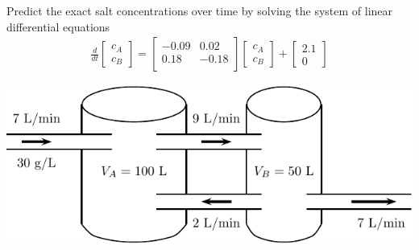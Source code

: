 \newpage

\begin{minipage}[h]{0.5\linewidth}
\vspace{0pt}
\begin{problem}
  Predict the exact salt concentrations over time by 
  solving the system of linear differential equations
  \begin{align*}
 \frac{d}{dt}    
 \begin{bmatrix} c_A \\ c_B 
     \end{bmatrix}
 =
 \begin{bmatrix}
 -0.09 & 0.02 \\
 0.18& -0.18 \\
 \end{bmatrix}
 \begin{bmatrix} c_A \\ c_B 
     \end{bmatrix}
+ 
\begin{bmatrix}
  2.1 \\ 0 
\end{bmatrix}
  \end{align*}
\end{problem}
\end{minipage} \hfill
\begin{minipage}[h]{0.45\linewidth}
\vspace{0pt}
\includegraphics[width=1.0\linewidth]{graphics/notes_09_tanks2}
\end{minipage}


\newpage


